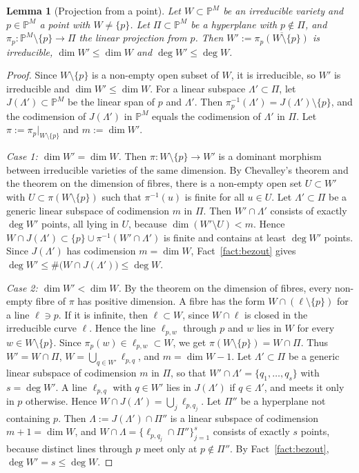 \documentclass[11pt]{article}
\newtheorem{lemma}[theorem]{Lemma}
\theoremstyle{definition}
\numberwithin{equation}{section}
\newcommand{\PP}{\mathbb{P}}
\begin{document}
\begin{lemma}[Projection from a point]\label{lem:projection}
Let $W\subset\PP^M$ be an irreducible variety and $p\in\PP^M$ a point with $W\neq\{p\}$. Let $\Pi\subset\PP^M$ be a hyperplane with $p\notin\Pi$, and $\pi_p:\PP^M\setminus\{p\}\to\Pi$ the linear projection from $p$. Then $W':=\overline{\pi_p(W\setminus\{p\})}$ is irreducible, $\dim W'\le\dim W$ and $\deg W'\le\deg W$.
\end{lemma}

\begin{proof}
Since $W\setminus\{p\}$ is a non-empty open subset of $W$, it is irreducible, so $W'$ is irreducible and $\dim W'\le\dim W$. For a linear subspace $\Lambda'\subset\Pi$, let $J(\Lambda')\subset\PP^M$ be the linear span of $p$ and $\Lambda'$. Then $\pi_p^{-1}(\Lambda')=J(\Lambda')\setminus\{p\}$, and the codimension of $J(\Lambda')$ in $\PP^M$ equals the codimension of $\Lambda'$ in $\Pi$. Let $\pi:=\pi_p|_{W\setminus\{p\}}$ and $m:=\dim W'$.

\emph{Case 1: $\dim W'=\dim W$.} Then $\pi:W\setminus\{p\}\to W'$ is a dominant morphism between irreducible varieties of the same dimension. By Chevalley's theorem and the theorem on the dimension of fibres, there is a non-empty open set $U\subset W'$ with $U\subset\pi(W\setminus\{p\})$ such that $\pi^{-1}(u)$ is finite for all $u\in U$. Let $\Lambda'\subset\Pi$ be a generic linear subspace of codimension $m$ in $\Pi$. Then $W'\cap\Lambda'$ consists of exactly $\deg W'$ points, all lying in $U$, because $\dim(W'\setminus U)<m$. Hence $W\cap J(\Lambda')\subset\{p\}\cup\pi^{-1}(W'\cap\Lambda')$ is finite and contains at least $\deg W'$ points. Since $J(\Lambda')$ has codimension $m=\dim W$, Fact~\ref{fact:bezout} gives $\deg W'\le\#\big(W\cap J(\Lambda')\big)\le\deg W$.

\emph{Case 2: $\dim W'<\dim W$.} By the theorem on the dimension of fibres, every non-empty fibre of $\pi$ has positive dimension. A fibre has the form $W\cap(\ell\setminus\{p\})$ for a line $\ell\ni p$. If it is infinite, then $\ell\subset W$, since $W\cap\ell$ is closed in the irreducible curve $\ell$. Hence the line $\ell_{p,w}$ through $p$ and $w$ lies in $W$ for every $w\in W\setminus\{p\}$. Since $\pi_p(w)\in\ell_{p,w}\subset W$, we get $\pi(W\setminus\{p\})=W\cap\Pi$. Thus $W'=W\cap\Pi$, $W=\bigcup_{q\in W'}\ell_{p,q}$, and $m=\dim W-1$. Let $\Lambda'\subset\Pi$ be a generic linear subspace of codimension $m$ in $\Pi$, so that $W'\cap\Lambda'=\{q_1,\dots,q_s\}$ with $s=\deg W'$. A line $\ell_{p,q}$ with $q\in W'$ lies in $J(\Lambda')$ if $q\in\Lambda'$, and meets it only in $p$ otherwise. Hence $W\cap J(\Lambda')=\bigcup_j\ell_{p,q_j}$. Let $\Pi''$ be a hyperplane not containing $p$. Then $\Lambda:=J(\Lambda')\cap\Pi''$ is a linear subspace of codimension $m+1=\dim W$, and $W\cap\Lambda=\{\ell_{p,q_j}\cap\Pi''\}_{j=1}^s$ consists of exactly $s$ points, because distinct lines through $p$ meet only at $p\notin\Pi''$. By Fact~\ref{fact:bezout}, $\deg W'=s\le\deg W$.
\end{proof}
\end{document}

